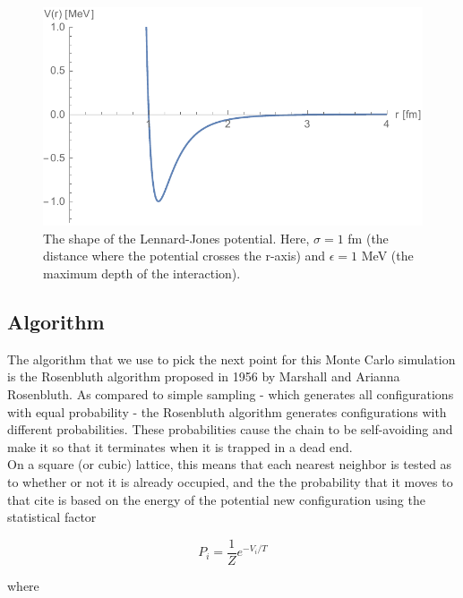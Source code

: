 \documentclass{article}
\begin{document}
\begin{multicols}{2}
\begin{figure}[H]
\begin{center}
\includegraphics[width=\linewidth]{Figures/VLJ.pdf}
\caption{The shape of the Lennard-Jones potential.  Here, $\sigma=1$ fm (the distance where the potential crosses the r-axis) and $\epsilon =1$ MeV (the maximum depth of the interaction).}
\label{VLJfig}
\end{center}
\end{figure}

\subsection{Algorithm}
\label{RA}

The algorithm that we use to pick the next point for this Monte Carlo simulation is the Rosenbluth algorithm proposed in 1956 by Marshall and Arianna Rosenbluth.  As compared to simple sampling - which generates all configurations with equal probability - the Rosenbluth algorithm generates configurations with different probabilities.  These probabilities cause the chain to be self-avoiding and make it so that it terminates when it is trapped in a dead end.  \cite{Rosenbluth} \\

On a square (or cubic) lattice, this means that each nearest neighbor is tested as to whether or not it is already occupied, and the the probability that it moves to that cite is based on the energy of the potential new configuration using the statistical factor

\begin{equation}
\label{prob}
P_i = \frac{1}{Z} e^{-V_i/T}
\end{equation}

\noindent where


\end{multicols}
\end{document}
